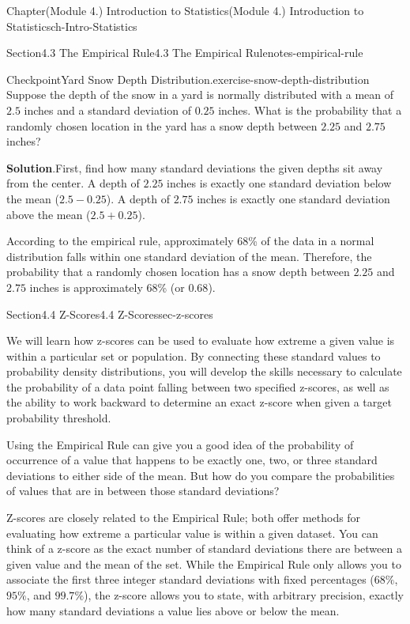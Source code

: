 \documentclass[oneside,10pt,]{book}
\newcommand{\blocktitlefont}{\relax}
\begin{document}
\begin{chapterptx}{Chapter}{(Module 4.) Introduction to Statistics}{}{(Module 4.) Introduction to Statistics}{}{}{ch-Intro-Statistics}
\begin{sectionptx}{Section}{4.3 The Empirical Rule}{}{4.3 The Empirical Rule}{}{}{notes-empirical-rule}
\begin{inlineexercise}{Checkpoint}{Yard Snow Depth Distribution.}{exercise-snow-depth-distribution}
Suppose the depth of the snow in a yard is normally distributed with a mean of \(2.5\) inches and a standard deviation of \(0.25\) inches. What is the probability that a randomly chosen location in the yard has a snow depth between \(2.25\) and \(2.75\) inches?%
\par\smallskip%
\noindent\textbf{\blocktitlefont Solution}.\hypertarget{exercise-snow-depth-distribution-3}{}\quad{}First, find how many standard deviations the given depths sit away from the center. A depth of \(2.25\) inches is exactly one standard deviation below the mean (\(2.5 - 0.25\)). A depth of \(2.75\) inches is exactly one standard deviation above the mean (\(2.5 + 0.25\)).%
\par
According to the empirical rule, approximately 68\% of the data in a normal distribution falls within one standard deviation of the mean. Therefore, the probability that a randomly chosen location has a snow depth between \(2.25\) and \(2.75\) inches is approximately 68\% (or \(0.68\)).%
\end{inlineexercise}%
\end{sectionptx}
%
%
\typeout{************************************************}
\typeout{************************************************}
%
\begin{sectionptx}{Section}{4.4 Z-Scores}{}{4.4 Z-Scores}{}{}{sec-z-scores}
\begin{introduction}{}%
We will learn how z-scores can be used to evaluate how extreme a given value is within a particular set or population. By connecting these standard values to probability density distributions, you will develop the skills necessary to calculate the probability of a data point falling between two specified z-scores, as well as the ability to work backward to determine an exact z-score when given a target probability threshold.%
\par
Using the Empirical Rule can give you a good idea of the probability of occurrence of a value that happens to be exactly one, two, or three standard deviations to either side of the mean. But how do you compare the probabilities of values that are in between those standard deviations?%
\par
Z-scores are closely related to the Empirical Rule; both offer methods for evaluating how extreme a particular value is within a given dataset. You can think of a z-score as the exact number of standard deviations there are between a given value and the mean of the set. While the Empirical Rule only allows you to associate the first three integer standard deviations with fixed percentages (\(68\%\), \(95\%\), and \(99.7\%\)), the z-score allows you to state, with arbitrary precision, exactly how many standard deviations a value lies above or below the mean.%

\end{introduction}
\end{sectionptx}
\end{chapterptx}
\end{document}
